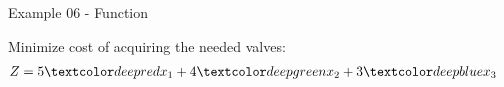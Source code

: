 \begin{frame}{Example 06 - Function}

Minimize  cost of acquiring the needed valves:
\Huge{
\begin{align*}
    Z &= 5\colora{x_1} + 4\colorb{x_2} + 3\colorc{x_3}
\end{align*}
}

\end{frame}
